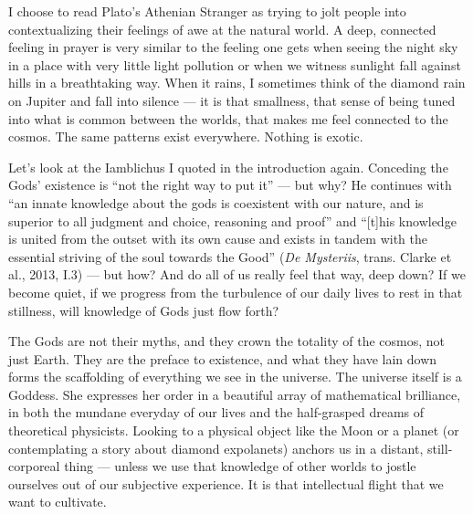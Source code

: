\documentclass[
]{book}
\begin{document}
I choose to read Plato's Athenian Stranger as trying to jolt people into contextualizing their feelings of awe at the natural world. A deep, connected feeling in prayer is very similar to the feeling one gets when seeing the night sky in a place with very little light pollution or when we witness sunlight fall against hills in a breathtaking way. When it rains, I sometimes think of the diamond rain on Jupiter and fall into silence --- it is that smallness, that sense of being tuned into what is common between the worlds, that makes me feel connected to the cosmos. The same patterns exist everywhere. Nothing is exotic.

Let's look at the Iamblichus I quoted in the introduction again. Conceding the Gods' existence is ``not the right way to put it'' --- but why? He continues with ``an innate knowledge about the gods is coexistent with our nature, and is superior to all judgment and choice, reasoning and proof'' and ``{[}t{]}his knowledge is united from the outset with its own cause and exists in tandem with the essential striving of the soul towards the Good'' (\emph{De Mysteriis}, trans. Clarke et al., 2013, I.3) --- but how? And do all of us really feel that way, deep down? If we become quiet, if we progress from the turbulence of our daily lives to rest in that stillness, will knowledge of Gods just flow forth?

The Gods are not their myths, and they crown the totality of the cosmos, not just Earth. They are the preface to existence, and what they have lain down forms the scaffolding of everything we see in the universe. The universe itself is a Goddess. She expresses her order in a beautiful array of mathematical brilliance, in both the mundane everyday of our lives and the half-grasped dreams of theoretical physicists. Looking to a physical object like the Moon or a planet (or contemplating a story about diamond expolanets) anchors us in a distant, still-corporeal thing --- unless we use that knowledge of other worlds to jostle ourselves out of our subjective experience. It is that intellectual flight that we want to cultivate.
\end{document}
